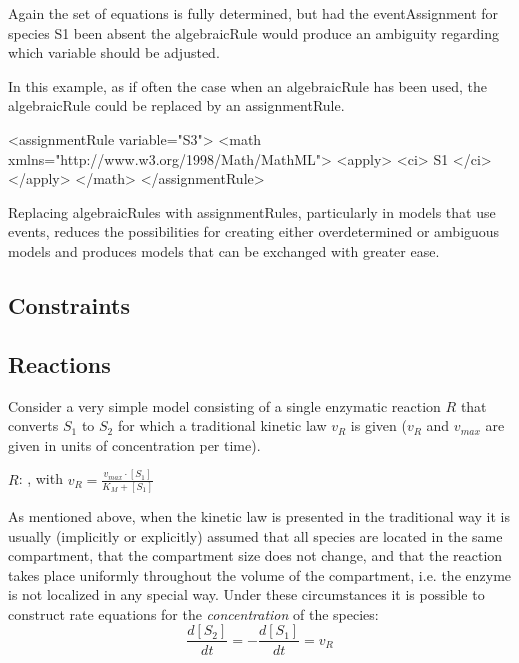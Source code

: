 Again the set of equations is fully determined, but had the eventAssignment for
species S1 been absent the algebraicRule would produce an ambiguity regarding
which variable should be adjusted.  

In this example, as if often the case
when an algebraicRule has been used, the algebraicRule could be replaced by an
assignmentRule.

\begin{example}
<assignmentRule variable="S3">
    <math xmlns="http://www.w3.org/1998/Math/MathML">
        <apply>
            <ci> S1 </ci>
        </apply>
    </math>
</assignmentRule>
\end{example}

Replacing algebraicRules with assignmentRules, particularly in models that
use events, reduces the possibilities for creating either overdetermined or
ambiguous models and produces models that can be exchanged with greater ease.


 





\subsection{Constraints}
\label{sec:bp:constraints}


\subsection{Reactions}
\label{sec:bp:reactions}


Consider a very simple model consisting of a single enzymatic reaction
$R$ that converts $S_{1}$ to $S_{2}$ for which a traditional kinetic
law $v_{R}$ is given ($v_{R}$ and $v_{max}$ are given in units
of concentration per time). 

\begin{center}
$R$: , with $v_{R}=\frac{v_{max}\cdot[S_{1}]}{K_{M}+[S_{1}]}$
\par\end{center}

As mentioned above, when the kinetic law is presented in the traditional
way it is usually (implicitly or explicitly) assumed that all species
are located in the same compartment, that the compartment size does
not change, and that the reaction takes place uniformly throughout
the volume of the compartment, i.e. the enzyme is not localized in
any special way. Under these circumstances it is possible to construct
rate equations for the \emph{concentration} of the species:\[
\frac{d[S_{2}]}{dt}=-\frac{d[S_{1}]}{dt}=v_{R}\]


